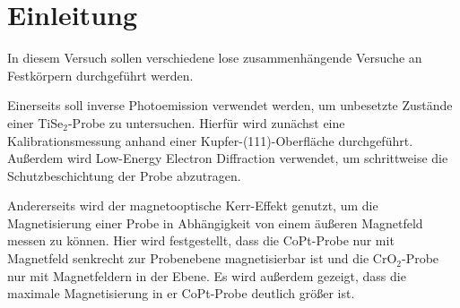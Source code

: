 \section{Einleitung}

  In diesem Versuch sollen verschiedene lose zusammenhängende Versuche an Festkörpern durchgeführt werden.

  Einerseits soll inverse Photoemission verwendet werden, um unbesetzte Zustände einer TiSe$_2$-Probe zu untersuchen.
  Hierfür wird zunächst eine Kalibrationsmessung anhand einer Kupfer-(111)-Oberfläche durchgeführt.
  Außerdem wird Low-Energy Electron Diffraction verwendet, um schrittweise die Schutzbeschichtung der Probe abzutragen.

  Andererseits wird der magnetooptische Kerr-Effekt genutzt, um die Magnetisierung einer Probe in Abhängigkeit von einem äußeren Magnetfeld messen zu können.
  Hier wird festgestellt, dass die CoPt-Probe nur mit Magnetfeld senkrecht zur Probenebene magnetisierbar ist und die CrO$_2$-Probe nur mit Magnetfeldern in der Ebene.
  Es wird außerdem gezeigt, dass die maximale Magnetisierung in er CoPt-Probe deutlich größer ist.
